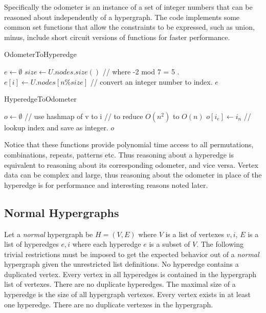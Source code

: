 Specifically the odometer is an instance of a set of integer numbers that can be reasoned about independently of a hypergraph. The code implements some common set functions that allow the constraints to be expressed, such as union, minus, include short circuit versions of functions for faster performance. 

\begin{algorithm}
	\caption{OdometerToHyperedge}\label{OtoE}
	\begin{algorithmic}[1]
		\State $e \gets \emptyset$
		\State $size \gets U.nodes.size()$
		\State // where -2 mod 7 = 5 .
		\State $e[i] \gets U.nodes[ n \% size ]$ // convert an integer number to index.
		\EndFor
		\State \Return $e$
		\EndFunction
	\end{algorithmic}
\end{algorithm}
\begin{algorithm}
	\caption{HyperedgeToOdometer}\label{EtoO}
	\begin{algorithmic}[1]
		\State $o \gets \emptyset$
		  // use hashmap of v to i
		 // to reduce $O(n^2)$ to $O(n)$
		\State $o[i_e] \gets i_n$ // lookup index and save as integer.
		\EndIf
		\EndFor
		\EndFor
		\State \Return $o$
		\EndFunction
	\end{algorithmic}
\end{algorithm}

Notice that these functions provide polynomial time access to all permutations, combinations, repeats, patterns etc. Thus reasoning about a hyperedge is equivalent to reasoning about its corresponding odometer, and vice versa. Vertex data can be complex and large, thus reasoning about the odometer in place of the hyperedge is for performance and interesting reasons noted later.
\newpage

\subsection{Normal Hypergraphs \cite{Hypergraph:Book}}
Let a \textit{normal} hypergraph be $H = (V,E)$ where $V$ is a list of vertexes ${v,i}$, $E$ is a list of hyperedges ${e,i}$ where each hyperedge $e$ is a subset of $V$. The following trivial restrictions must be imposed to get the expected behavior out of a \textit{normal} hypergraph given the unrestricted list definitions. No hyperedge contains a duplicated vertex. Every vertex in all hyperedges is contained in the hypergraph list of vertexes. There are no duplicate hyperedges. The maximal size of a hyperedge is the size of all hypergraph vertexes. Every vertex exists in at least one hyperedge. There are no duplicate vertexes in the hypergraph.\\



